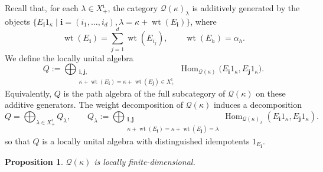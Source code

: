 \documentclass[a4,10pt]{amsart}
\numberwithin{equation}{section}
\newtheorem{Prop}[Theorem]{Proposition}
\theoremstyle{definition}
\begin{document}
Recall that, for each \(\lambda\in X^\imath_+\),
the category \(\mathcal Q(\kappa)_\lambda\) is additively
generated by the objects
\(\{
E_{\mathbf i}1_\kappa\mid 
\mathbf i=(i_1,\ldots,i_d),
\lambda=\kappa+\operatorname{wt}(E_{\mathbf i})\}\),
where
\[
\operatorname{wt}(E_{\mathbf i})
=
\sum_{j=1}^{d}\operatorname{wt}(E_{i_j}),
\qquad
\operatorname{wt}(E_h)=\alpha_h.
\]
We define the locally unital algebra
\[
Q:=
\bigoplus_{
  \substack{
    \mathbf i,\mathbf j,\\
    \kappa+\operatorname{wt}(E_{\mathbf i})
    =
    \kappa+\operatorname{wt}(E_{\mathbf j})
    \in X^\imath_+
  }}
\operatorname{Hom}_{\mathcal Q(\kappa)}
\bigl(E_{\mathbf i}1_\kappa,E_{\mathbf j}1_\kappa\bigr).
\]
Equivalently, \(Q\) is the path algebra of the full subcategory
of \(\mathcal Q(\kappa)\) on these additive generators.
The weight decomposition of $\mathcal Q(\kappa)$ induces a decomposition
\[
Q=\bigoplus_{\lambda\in X^\imath_+}Q_\lambda,
\qquad
Q_\lambda:=
\bigoplus_{\substack{\mathbf i,\mathbf j\\
\kappa+\operatorname{wt}(E_{\mathbf i})
=\kappa+\operatorname{wt}(E_{\mathbf j})=\lambda}}
\operatorname{Hom}_{\mathcal Q(\kappa)_\lambda}
(E_{\mathbf i}1_\kappa,E_{\mathbf j}1_\kappa).
\]
so that $Q$ is a locally unital algebra with distinguished idempotents $1_{E_\mathbf i}$.

\begin{Prop}  $\mathcal Q(\kappa)$ is locally
finite-dimensional. \end{Prop}
\end{document}
